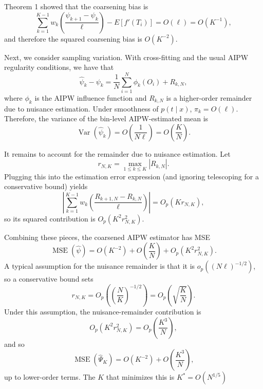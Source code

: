 \documentclass[11pt]{article}
\begin{document}
Theorem 1 showed that the coarsening bias is
\begin{equation}
\sum_{k=1}^{K-1}
w_k
\left(
\frac{\psi_{k+1}-\psi_k}{\ell}
\right)
-
E[f'(T_i)]
=
O(\ell)
=
O(K^{-1}),
\end{equation}
and therefore the squared coarsening bias is $O(K^{-2})$.

Next, we consider sampling variation. With cross-fitting and the usual AIPW
regularity conditions, we have that
\begin{equation}
\hat\psi_k-\psi_k
=
\frac{1}{N}\sum_{i=1}^N \phi_k(O_i)
+
R_{k,N},
\end{equation}
where $\phi_k$ is the AIPW influence function and $R_{k,N}$ is
a higher-order remainder due to nuisance estimation.  Under smoothness of $p(t\mid x)$, $\pi_k = O(\ell)$.  Therefore, the variance of the bin-level AIPW-estimated mean is
\begin{equation}
\operatorname{Var}(\hat\psi_k)=O\left(\frac{1}{N\ell}\right)
=
O\left(\frac{K}{N}\right).
\end{equation}

It remains to account for the remainder due to nuisance estimation. Let
\begin{equation}
r_{N,K}=\max_{1\le k\le K}|R_{k,N}|.
\end{equation}
Plugging this into the estimation error expression (and ignoring telescoping for a conservative bound) yields
\begin{equation}
\left|
\sum_{k=1}^{K-1}
w_k
\left(
\frac{R_{k+1,N}-R_{k,N}}{\ell}
\right)
\right|
=
O_p(Kr_{N,K}),
\end{equation}
so its squared contribution is $O_p(K^2r_{N,K}^2)$.

Combining these pieces, the coarsened AIPW estimator has MSE
\begin{equation}
\operatorname{MSE}(\widehat\psi)
=
O(K^{-2})
+
O\left(\frac{K}{N}\right)
+
O_p(K^2r_{N,K}^2).
\end{equation}
A typical assumption for the nuisance remainder is that it is $o_p((N\ell)^{-1/2})$, so a conservative bound sets
\begin{equation}
r_{N,K}
=
O_p\left(\left(\frac{N}{K}\right)^{-1/2}\right)
=
O_p\left(\sqrt{\frac{K}{N}}\right).
\end{equation}
Under this assumption, the nuisance-remainder contribution is
\begin{equation}
O_p(K^2r_{N,K}^2)
=
O_p\left(\frac{K^3}{N}\right),
\end{equation}
and so
\begin{equation}
\operatorname{MSE}(\hat\Psi_K)
=
O(K^{-2})
+
O\left(\frac{K^3}{N}\right),
\end{equation}
up to lower-order terms.  The $K$ that minimizes this is $K^*=O(N^{1/5})$
\end{document}
